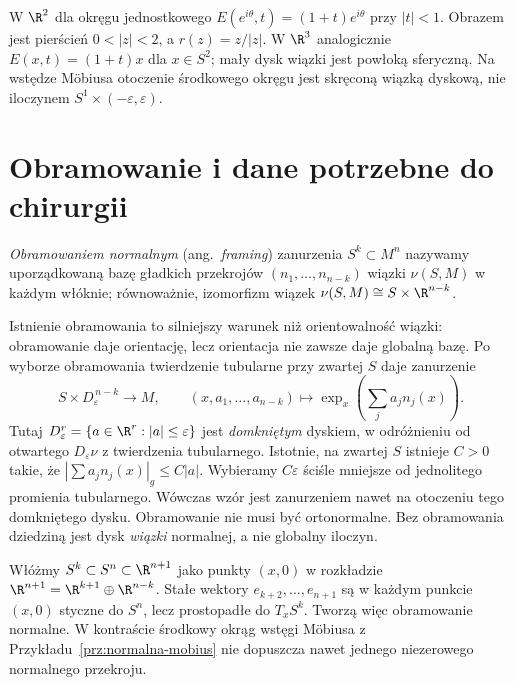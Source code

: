 \begin{przyklad}
W $\R^2$ dla okręgu jednostkowego
$E(e^{i\theta},t)=(1+t)e^{i\theta}$
przy $|t|<1$. Obrazem jest pierścień
$0<|z|<2$, a $r(z)=z/|z|$.
W $\R^3$ analogicznie
$E(x,t)=(1+t)x$ dla $x\in S^2$;
mały dysk wiązki jest powłoką
sferyczną. Na wstędze Möbiusa
otoczenie środkowego okręgu
jest skręconą wiązką dyskową,
nie iloczynem $S^1\times(-\varepsilon,\varepsilon)$.
\end{przyklad}

\section{Obramowanie i dane potrzebne do chirurgii}
\label{sec:obramowanie-normalne}

\begin{definicja}[Obramowanie]
\label{def:obramowanie-normalne}
\emph{Obramowaniem normalnym} (ang.\ \emph{framing})
zanurzenia $S^k\subset M^n$ nazywamy
uporządkowaną bazę gładkich przekrojów
$(n_1,\ldots,n_{n-k})$ wiązki $\nu(S,M)$
w każdym włóknie; równoważnie,
izomorfizm wiązek
$\nu(S,M)\cong S\times\R^{n-k}$.
\end{definicja}

Istnienie obramowania to silniejszy
warunek niż orientowalność wiązki:
obramowanie daje orientację, lecz
orientacja nie zawsze daje globalną
bazę. Po wyborze obramowania
twierdzenie tubularne przy zwartej
$S$ daje zanurzenie
\begin{equation}\label{eq:obramowany-dysk}
 S\times D^{\,n-k}_{\varepsilon}
 \longrightarrow M,\qquad
 (x,a_1,\ldots,a_{n-k})
 \longmapsto
 \exp_x\!\left(\sum_j a_jn_j(x)\right).
\end{equation}
Tutaj $D^r_\varepsilon=\{a\in\R^r:|a|\leq\varepsilon\}$
jest \emph{domkniętym} dyskiem, w odróżnieniu od otwartego
$D_\varepsilon\nu$ z twierdzenia tubularnego.
Istotnie, na zwartej $S$ istnieje $C>0$ takie, że
$|\sum a_jn_j(x)|_g\leq C|a|$. Wybieramy
$C\varepsilon$ ściśle mniejsze od jednolitego promienia
tubularnego. Wówczas wzór jest zanurzeniem nawet
na otoczeniu tego domkniętego dysku. Obramowanie
nie musi być ortonormalne.
Bez obramowania dziedziną jest
dysk \emph{wiązki} normalnej,
a nie globalny iloczyn.

\begin{przyklad}
Włóżmy $S^k\subset S^n\subset\R^{n+1}$
jako punkty $(x,0)$ w rozkładzie
$\R^{n+1}=\R^{k+1}\oplus\R^{n-k}$.
Stałe wektory $e_{k+2},\ldots,e_{n+1}$
są w każdym punkcie $(x,0)$ styczne
do $S^n$, lecz prostopadłe do $T_xS^k$.
Tworzą więc obramowanie normalne.
W kontraście środkowy okrąg wstęgi
Möbiusa z Przykładu~\ref{prz:normalna-mobius}
nie dopuszcza nawet jednego
niezerowego normalnego przekroju.
\end{przyklad}

